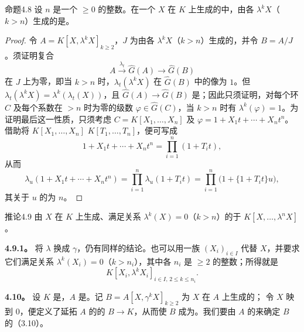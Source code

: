 \begin{SGAresult}{命题}{4.8}
设 $n$ 是一个 $\geqslant0$ 的整数。在一个 $X$ 在 $K$ 上生成的中，由各 $\lambda^kX$（$k>n$）生成的是。
\end{SGAresult}
\begin{proof}
令 $A=K[X,\lambda^kX]_{k\geqslant2}$，$J$ 为由各 $\lambda^kX$（$k>n$）生成的，并令 $B=A/J$。须证明复合
\[
A\xrightarrow{\lambda_t}\widehat G(A)\longrightarrow\widehat G(B)
\]
在 $J$ 上为零，即当 $k>n$ 时，$\lambda_t(\lambda^kX)$ 在 $\widehat G(B)$ 中的像为 $1$。但 $\lambda_t(\lambda^kX)=\lambda^k(\lambda_t(X))$，且 $\widehat G(A)\longrightarrow\widehat G(B)$ 是；因此只须证明，对每个环 $C$ 及每个系数在 $>n$ 时为零的级数 $\varphi\in\widehat G(C)$，当 $k>n$ 时有 $\lambda^k(\varphi)=1$。为证明最后这一性质，只须考虑 $C=K[X_1,\ldots,X_n]$ 及 $\varphi=1+X_1t+\cdots+X_nt^n$。借助将 $K[X_1,\ldots,X_n]$  $K[T_1,\ldots,T_n]$，便可写成
\[
1+X_1t+\cdots+X_nt^n=\prod_{i=1}^n(1+T_it),
\]
从而
\[
\lambda_u(1+X_1t+\cdots+X_nt^n)
=\prod_{i=1}^n\lambda_u(1+T_it)
=\prod_{i=1}^n\bigl(1+\{1+T_it\}u\bigr),
\]
其关于 $u$ 的为 $n$。
\end{proof}

\begin{SGAresult}{推论}{4.9}
由 $X$ 在 $K$ 上生成、满足关系 $\lambda^k(X)=0$（$k>n$）的于 $K[X,\ldots,\lambda^nX]$。
\end{SGAresult}

\textbf{4.9.1。} 将 $\lambda$ 换成 $\gamma$，仍有同样的结论。也可以用一族 $(X_i)_{i\in I}$ 代替 $X$，并要求它们满足关系 $\lambda^k(X_i)=0$（$k>n_i$），其中各 $n_i$ 是 $\geqslant2$ 的整数；所得就是
\[
K[X_i,\lambda^kX_i]_{i\in I,\,2\leqslant k\leqslant n_i}.
\]

\textbf{4.10。} 设 $K$ 是，$A$ 是。记 $B=A[X,\gamma^kX]_{k\geqslant2}$ 为 $X$ 在 $A$ 上生成的；
令 $X$ 映到 $0$，便定义了延拓 $A$ 的的 $B\longrightarrow K$，从而使 $B$ 成为。我们要由 $A$ 的来确定 $B$ 的（3.10）。

